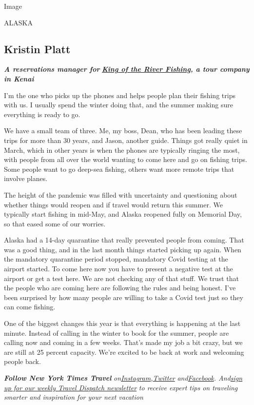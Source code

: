 Image

ALASKA

\hypertarget{kristin-platt}{%
\subsection{Kristin Platt}\label{kristin-platt}}

\emph{\textbf{A reservations manager for}}
\textbf{\href{https://www.kingoftheriver.com/}{\emph{King of the River
Fishing}}\emph{, a tour company in Kenai}}

I'm the one who picks up the phones and helps people plan their fishing
trips with us. I usually spend the winter doing that, and the summer
making sure everything is ready to go.

We have a small team of three. Me, my boss, Dean, who has been leading
these trips for more than 30 years, and Jason, another guide. Things got
really quiet in March, which in other years is when the phones are
typically ringing the most, with people from all over the world wanting
to come here and go on fishing trips. Some people want to go deep-sea
fishing, others want more remote trips that involve planes.

The height of the pandemic was filled with uncertainty and questioning
about whether things would reopen and if travel would return this
summer. We typically start fishing in mid-May, and Alaska reopened fully
on Memorial Day, so that eased some of our worries.

Alaska had a 14-day quarantine that really prevented people from coming.
That was a good thing, and in the last month things started picking up
again. When the mandatory quarantine period stopped, mandatory Covid
testing at the airport started. To come here now you have to present a
negative test at the airport or get a test here. We are not checking any
of that stuff. We trust that the people who are coming here are
following the rules and being honest. I've been surprised by how many
people are willing to take a Covid test just so they can come fishing.

One of the biggest changes this year is that everything is happening at
the last minute. Instead of calling in the winter to book for the
summer, people are calling now and coming in a few weeks. That's made my
job a bit crazy, but we are still at 25 percent capacity. We're excited
to be back at work and welcoming people back.

\emph{\textbf{Follow New York Times Travel}}
\emph{on}\href{https://www.instagram.com/nytimestravel/}{\emph{Instagram}}\emph{,}\href{https://twitter.com/nytimestravel}{\emph{Twitter}}
\emph{and}\href{https://www.facebook.com/nytimestravel/}{\emph{Facebook}}\emph{.
And}\href{https://www.nytimes.com/newsletters/traveldispatch}{\emph{sign
up for our weekly Travel Dispatch newsletter}} \emph{to receive expert
tips on traveling smarter and inspiration for your next vacation}


